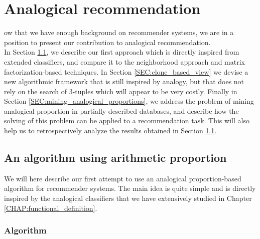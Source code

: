 \chapter{Analogical recommendation}
\label{CHAP:analogical_recommendation}
\localtableofcontents*
\vspace*{\baselineskip}

ow that we have enough background on recommender systems, we are in
a position to present our contribution to analogical recommendation.\\

In Section \ref{SEC:analogical_reco_basic_algo}, we describe our first approach
which is directly inspired from extended classifiers, and compare it to the
neighborhood approach and matrix factorization-based techniques. In Section
\ref{SEC:clone_based_view} we devise a new algorithmic framework that is still
inspired by analogy, but that does not rely on the search of $3$-tuples which
will appear to be very costly. Finally in Section
\ref{SEC:mining_analogical_proportions}, we address the problem of mining
analogical proportion in partially described databases, and describe how the
solving of this problem can be applied to a recommendation task. This will also
help us to retrospectively analyze the results obtained in Section
\ref{SEC:analogical_reco_basic_algo}.

\section{An algorithm using arithmetic proportion}
\label{SEC:analogical_reco_basic_algo}
We will here describe our first attempt to use an analogical proportion-based
algorithm for recommender systems. The main idea is quite simple and is
directly inspired by the analogical classifiers that we have extensively
studied in Chapter \ref{CHAP:functional_definition}.
\subsection{Algorithm}

